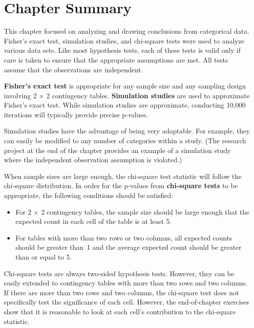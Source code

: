 \documentclass[
]{report}
\providecommand{\tightlist}{%
  \setlength{\itemsep}{0pt}\setlength{\parskip}{0pt}}
\begin{document}
\section{\texorpdfstring{\textbf{Chapter Summary}}{Chapter Summary}}\label{chapter-summary-4}

This chapter focused on analyzing and drawing conclusions from categorical data. Fisher's exact test, simulation studies, and chi-square tests were used to analyze various data sets. Like most hypothesis tests, each of these tests is valid only if care is taken to ensure that the appropriate assumptions are met. All tests assume that the observations are independent.

\textbf{Fisher's exact test} is appropriate for any sample size and any sampling design involving 2 × 2 contingency tables. \textbf{Simulation studies} are used to approximate Fisher's exact test. While simulation studies are approximate, conducting 10,000 iterations will typically provide precise p‑values.

Simulation studies have the advantage of being very adaptable. For example, they can easily be modified to any number of categories within a study. (The research project at the end of the chapter provides an example of a simulation study where the independent observation assumption is violated.)

When sample sizes are large enough, the chi-square test statistic will follow the chi-square distribution. In order for the p‑values from \textbf{chi-square tests} to be appropriate, the following conditions should be satisfied:

\begin{itemize}
\tightlist
\item
  For 2 × 2 contingency tables, the sample size should be large enough that the expected count in each cell of the table is at least 5.
\item
  For tables with more than two rows or two columns, all expected counts should be greater than~1 and the average expected count should be greater than or equal to 5.
\end{itemize}

Chi-square tests are always two‑sided hypothesis tests. However, they can be easily extended to contingency tables with more than two rows and two columns. If there are more than two rows and two columns, the chi-square test does not specifically test the significance of each cell. However, the end‑of‑chapter exercises show that it is reasonable to look at each cell's contribution to the chi-square statistic.
\end{document}

